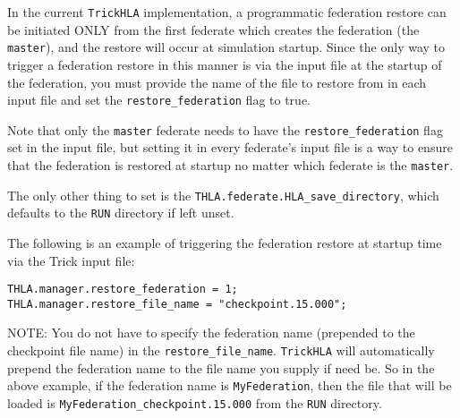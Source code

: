 In the current {\tt TrickHLA} implementation, a programmatic federation restore can be initiated
ONLY from the first federate which creates the federation (the {\tt master}), and the restore will occur at simulation startup.
Since the only way to trigger a federation restore in this manner is via
the input file at the startup of the federation, you must provide
the name of the file to restore from in each input file and set the
{\tt restore\_federation} flag to true.

Note that only the {\tt master} federate needs to have the {\tt restore\_federation} flag
set in the input file, but setting it in every federate's input file is a way to ensure that the federation is restored at startup no matter
which federate is the {\tt master}.

The only other thing to set is the {\tt THLA.federate.HLA\_save\_directory}, 
which defaults to the {\tt RUN} directory if left unset.

The following is an example of triggering the federation restore at startup time via the Trick input file:

\begin{verbatim}
THLA.manager.restore_federation = 1;
THLA.manager.restore_file_name = "checkpoint.15.000";
\end{verbatim}

NOTE: You do not have to specify the federation name (prepended to the checkpoint file name) in the {\tt restore\_file\_name}.
{\tt TrickHLA} will automatically prepend the federation name to the file name you supply if need be. So in the above example, if the federation 
name is {\tt MyFederation}, then the file that will be loaded is {\tt MyFederation\_checkpoint.15.000} from the {\tt RUN} directory.
